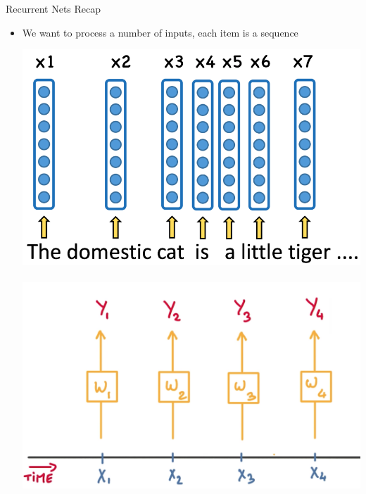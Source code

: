 \documentclass{beamer}
\begin{document}
\begin{frame}{Recurrent Nets Recap}
	\begin{itemize}
		\item We want to process a number of inputs, each item is a sequence 
		
		\begin{center}
			\includegraphics[scale=0.13]{img/emb}~~
			\includegraphics[scale=0.11]{img/rec}
		\end{center}
		

\end{itemize}
\end{frame}
\end{document}
